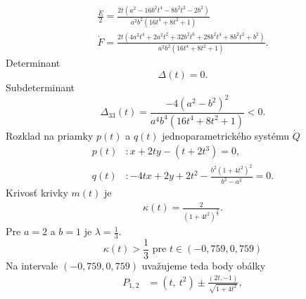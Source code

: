 \begin{example}[Parabola]
\begin{gather*}
\frac{\dot{E}}{2} = \frac{2 t \left(a^{2} - 16 b^{2} t^{4} - 8 b^{2} t^{2} - 2 b^{2}\right)}{a^{2} b^{2} \left(16 t^{4} + 8 t^{2} + 1\right)}\\
\dot{F} = \frac{2 t \left(4 a^{2} t^{4} + 2 a^{2} t^{2} + 32 b^{2} t^{6} + 28 b^{2} t^{4} + 8 b^{2} t^{2} + b^{2}\right)}{a^{2} b^{2} \left(16 t^{4} + 8 t^{2} + 1\right)}.
\end{gather*}
Determinant 
$$
\Delta(t) = 0. 
$$
Subdeterminant
$$\Delta_{33}(t) = \frac{-4 (a^2 - b^2)^2}{a^{4} b^{4} \left(16 t^{4} + 8 t^{2} + 1\right)} < 0.$$
Rozklad na priamky $p(t)$ a $q(t)$ jednoparametrického systému $\dot{Q}$  
\begin{align*}
p(t)& \colon x+2ty - \left(t + 2t^{3}\right)=0, \\
q(t)& \colon -4tx+2y+2t^{2}-\frac{b^{2}\left(1+4t^{2}\right)^{2}}{b^{2}-a^{2}}=0.
\end{align*}
Krivosť krivky $m(t)$ je
\begin{align*}
\kappa(t) = \frac{2}{\left(1+4t^{2}\right)^{\frac{3}{2}}}.
\end{align*}
Pre $a=2$ a $b=1$ je $\lambda = \frac{1}{3}$.
$$
\kappa(t) > \frac{1}{3} \text{ pre } t \in (-0,759,0,759)
$$
Na intervale $(-0,759,0,759)$ uvažujeme teda body obálky
\begin{align*}
P_{1,2} &= \left(t,\ t^{2}\right)\pm \frac{\left(2t,-1\right)}{\sqrt{1+4t^{2}}}, \\

\end{align*}
\end{example}
